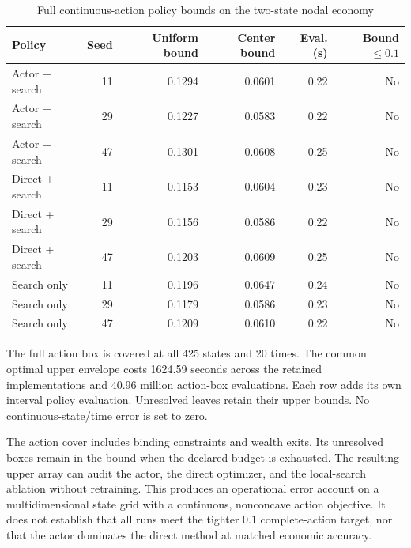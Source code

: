 \documentclass[ecta,nameyear,draft]{econsocart}
\theoremstyle{definition}
\theoremstyle{remark}
\begin{document}
\begin{table}[htbp]\centering
\caption{Full continuous-action policy bounds on the two-state nodal economy}
\begin{small}\begin{tabular}{lrrrrr}
\toprule
Policy & Seed & Uniform bound & Center bound & Eval. (s) & Bound $\leq 0.1$ \\
\midrule
Actor + search & 11 & 0.1294 & 0.0601 & 0.22 & No \\
Actor + search & 29 & 0.1227 & 0.0583 & 0.22 & No \\
Actor + search & 47 & 0.1301 & 0.0608 & 0.25 & No \\
Direct + search & 11 & 0.1153 & 0.0604 & 0.23 & No \\
Direct + search & 29 & 0.1156 & 0.0586 & 0.22 & No \\
Direct + search & 47 & 0.1203 & 0.0609 & 0.25 & No \\
Search only & 11 & 0.1196 & 0.0647 & 0.24 & No \\
Search only & 29 & 0.1179 & 0.0586 & 0.23 & No \\
Search only & 47 & 0.1209 & 0.0610 & 0.22 & No \\
\bottomrule\end{tabular}\end{small}
\par\smallskip\begin{minipage}{0.96\linewidth}\footnotesize The full action box is covered at all 425 states and 20 times. The common optimal upper envelope costs 1624.59 seconds across the retained implementations and 40.96 million action-box evaluations. Each row adds its own interval policy evaluation. Unresolved leaves retain their upper bounds. No continuous-state/time error is set to zero.\end{minipage}
\end{table}


The action cover includes binding constraints and wealth exits. Its unresolved boxes remain in the bound when the declared budget is exhausted. The resulting upper array can audit the actor, the direct optimizer, and the local-search ablation without retraining. This produces an operational error account on a multidimensional state grid with a continuous, nonconcave action objective. It does not establish that all runs meet the tighter $0.1$ complete-action target, nor that the actor dominates the direct method at matched economic accuracy.
\end{document}
